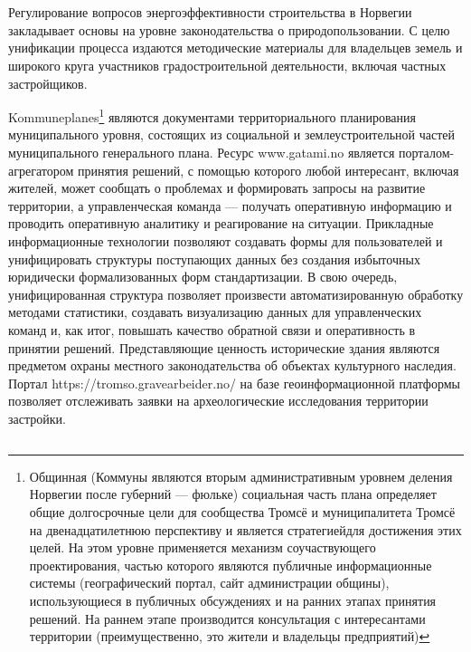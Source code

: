 \section{}





\subsection{\scAssesmentBuildingLaw}
% 
Регулирование вопросов энергоэффективности строительства в Норвегии закладывает основы на уровне законодательства о природопользовании.
С целю унификации процесса издаются методические материалы \cite{law_NORW_RulesCode_Natureuse} для владельцев земель и широкого круга участников градостроительной деятельности, включая частных застройщиков.


Kommuneplanes\footnote{Общинная (Коммуны являются вторым административным уровнем деления Норвегии после губерний  — фюльке)
            социальная часть плана определяет общие долгосрочные цели для сообщества Тромсё и муниципалитета Тромсё на двенадцатилетнюю перспективу и является стратегиейдля достижения этих целей.
            На этом уровне применяется механизм соучаствующего проектирования, частью которого являются публичные информационные системы (географический портал, сайт администрации общины),
            использующиеся в публичных обсуждениях и на ранних этапах принятия решений.
            На раннем этапе производится консультация с интересантами территории (преимущественно, это жители и владельцы предприятий)}
являются документами территориального планирования муниципального уровня, состоящих из социальной и землеустроительной частей муниципального генерального плана.
Ресурс www.gatami.no является порталом-агрегатором принятия решений, с помощью которого любой интересант, включая жителей,
может сообщать о проблемах и формировать запросы на развитие территории, а управленческая команда — получать оперативную информацию и проводить оперативную аналитику
и реагирование на ситуации. Прикладные информационные технологии позволяют создавать формы для пользователей и унифицировать структуры поступающих данных без создания избыточных юридически формализованных форм стандартизации. В свою очередь, унифицированная структура позволяет произвести автоматизированную обработку методами статистики, создавать визуализацию данных для управленческих команд и, как итог, повышать качество обратной связи и оперативность в принятии решений.
Представляющие ценность исторические здания являются предметом охраны местного законодательства об объектах культурного наследия.
Портал https://tromso.gravearbeider.no/ на базе геоинформационной платформы позволяет отслеживать заявки на археологические исследования территории застройки.



\subsection{\scAssesmentExp}
